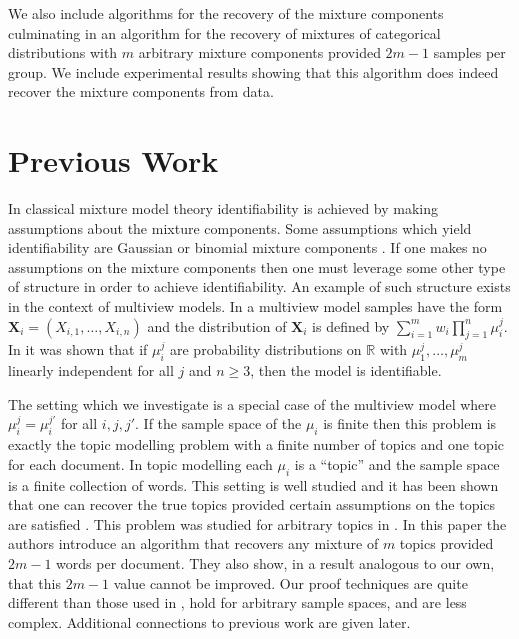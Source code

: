 \documentclass[aos,preprint]{imsart}
\def\rn{\mathbb{R}}
\def\bX{\mathbf{X}}
\theoremstyle{plain}
\theoremstyle{defintion}
\begin{document}
	We also include algorithms for the recovery of the mixture components culminating in an algorithm for the recovery of mixtures of categorical distributions with $m$ arbitrary mixture components provided $2m-1$ samples per group. We include experimental results showing that this algorithm does indeed recover the mixture components from data.
	\section{Previous Work}
	In classical mixture model theory identifiability is achieved by making assumptions about the mixture components. Some assumptions which yield identifiability are Gaussian or binomial mixture components \cite{bruni85,teicher63}. If one makes no assumptions on the mixture components then one must leverage some other type of structure in order to achieve identifiability. An example of such structure exists in the context of multiview models. In a multiview model samples have the form $\bX_i = \left( X_{i,1},\ldots, X_{i,n} \right)$ and the distribution of $\bX_i$ is defined by $\sum_{i=1}^m w_i \prod_{j=1}^n \mu_i^j$. In \cite{allman09} it was shown that if $\mu_i^j$ are probability distributions on $\rn$ with $\mu_1^j,\ldots,\mu_m^j$ linearly independent for all $j$ and $n\ge 3$, then the model is identifiable.

	The setting which we investigate is a special case of the multiview model where $\mu_i^j = \mu_i^{j'}$ for all $i,j,j'$. If the sample space of the $\mu_i$ is finite then this problem is exactly the topic modelling problem with a finite number of topics and one topic for each document. In topic modelling each $\mu_i$ is a ``topic'' and the sample space is a finite collection of words. This setting is well studied and it has been shown that one can recover the true topics provided certain assumptions on the topics are satisfied \cite{allman09, anandkumar14, arora12}. This problem was studied for arbitrary topics in \cite{rabani14}. In this paper the authors introduce an algorithm that recovers any mixture of $m$ topics provided $2m-1$ words per document. They also show, in a result analogous to our own, that this $2m-1$ value cannot be improved. Our proof techniques are quite different than those used in \cite{rabani14}, hold for arbitrary sample spaces, and are less complex. Additional connections to previous work are given later.
\end{document}
